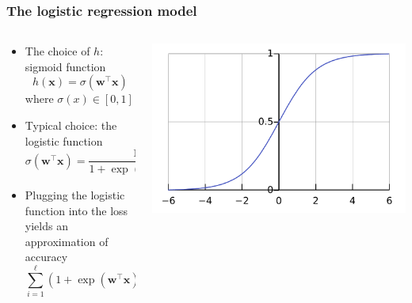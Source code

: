 \documentclass[usenames,dvipsnames,aspectratio=169]{beamer}
\begin{document}
\begin{frame}
\frametitle{The logistic regression model}

% 
\vspace{-2.5mm}
\begin{columns}
\begin{column}{0.55\textwidth}

\begin{itemize}

  \item The choice of $h$: sigmoid function
  \[
  h(\mathbf{x}) = \sigma(\mathbf{w}^{\intercal} \mathbf{x})
  \]
  where $\sigma(x) \in [0, 1]$

  \item Typical choice: the logistic function
  \[
  \sigma(\mathbf{w}^{\intercal} \mathbf{x}) = 
  \frac{1} {1 + \exp(-\mathbf{w}^{\intercal} \mathbf{x})}
  \]

  \item Plugging the logistic function into
  the loss yields an approximation of accuracy
  \vspace{-2mm}
  \[
  \sum\limits_{i=1}^{\ell}
    (1 + \exp(\mathbf{w}^{\intercal} \mathbf{x}))
    \to \min\limits_{\mathbf{w} \in \mathbb{R}^d}
  \]

\end{itemize}

\end{column}
\begin{column}{0.45\textwidth}  %
    \begin{center}
    \includegraphics[width=\columnwidth]{linregr-logistic-func.pdf}
     \end{center}
\end{column}
\end{columns}

\end{frame}
\end{document}
